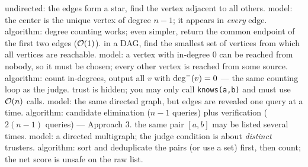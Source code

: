 \begin{variantsbox}
  {undirected: the edges form a star, find the vertex adjacent to all others.}
  {model: the center is the unique vertex of degree $n-1$; it appears in \emph{every} edge.}
  {algorithm: degree counting works; even simpler, return the common endpoint of the first two edges ($\mathcal{O}(1)$).}
  {in a DAG, find the smallest set of vertices from which all vertices are reachable.}
  {model: a vertex with in-degree 0 can be reached from nobody, so it must be chosen; every other vertex is reached from some source.}
  {algorithm: count in-degrees, output all $v$ with $\deg^{-}(v) = 0$ --- the same counting loop as the judge.}
  {trust is hidden; you may only call \texttt{knows(a,b)} and must use $\mathcal{O}(n)$ calls.}
  {model: the same directed graph, but edges are revealed one query at a time.}
  {algorithm: candidate elimination ($n-1$ queries) plus verification ($2(n-1)$ queries) --- Approach 3.}
  {the same pair $[a,b]$ may be listed several times.}
  {model: a directed multigraph; the judge condition is about \emph{distinct} trusters.}
  {algorithm: sort and deduplicate the pairs (or use a set) first, then count; the net score is unsafe on the raw list.}
\end{variantsbox}

